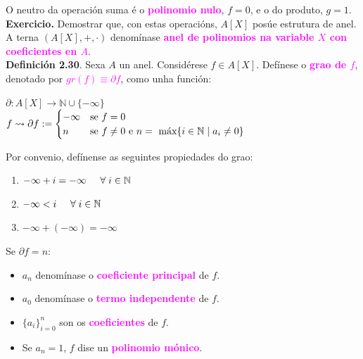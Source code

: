 \documentclass[twoside]{report}
\newcommand{\magbf}[1]{\textcolor{magenta}{\textbf{#1}}} %
\theoremstyle{mystyle}
\begin{document}
\noindent O neutro da operación suma é o \magbf{polinomio nulo}, $f = 0$, e o do produto, $g = 1$.\\

\noindent \textbf{Exercicio.} Demostrar que, con estas operacións, $A[X]$ posúe estrutura de anel. A terna $(A[X], +, ·)$ denomínase \magbf{anel de polinomios na variable $X$ con coeficientes en $A$}.\\

\noindent \textbf{Definición 2.30}. Sexa $A$ un anel. Considérese $f \in A[X]$. Defínese o \magbf{grao de $f$}, denotado por \magbf{$gr(f) \equiv \partial f$}, como unha función:\\
\begin{center}
    $\partial: A[X] \longrightarrow \mathbb{N}\cup \{-\infty\}$\\
    \vspace{5mm}
    \hspace{70mm} $f \leadsto \partial f := 
    \begin{cases}
    -\infty & \text{se } f = 0\\
    n & \text{se } f \neq 0 \text{ e } n = \text{ máx}\{i \in \mathbb{N} \hspace{1mm} | \hspace{1mm} a_{i} \neq 0\}
    \end{cases}$\\
\end{center}

\vspace{5mm}

\noindent Por convenio, defínense as seguintes propiedades do grao:
\begin{enumerate}
    \item $-\infty + i = -\infty \hspace{5mm} \forall \hspace{1mm} i \in \mathbb{N}$
    \item $-\infty < i \hspace{5mm} \forall \hspace{1mm} i \in \mathbb{N}$
    \item $-\infty + (-\infty) = -\infty$
\end{enumerate}

\pagebreak

\noindent Se $\partial f = n$:

\begin{itemize}
    \item $a_{n}$ denomínase o \magbf{coeficiente principal} de $f$.
    \item $a_{0}$ denomínase o \magbf{termo independente} de $f$.
    \item $\{a_{i}\}_{i = 0}^{n}$ son os \magbf{coeficientes} de $f$.
    \item Se $a_{n} = 1$, $f$ dise un \magbf{polinomio mónico}.\\
\end{itemize}
\end{document}
